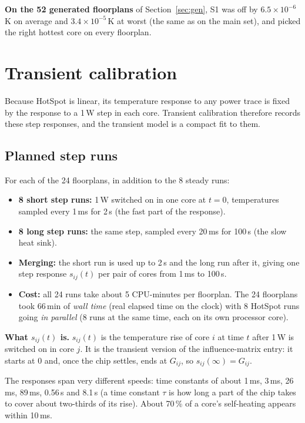 \documentclass[11pt,a4paper]{article}
\begin{document}
\textbf{On the 52 generated floorplans} of Section~\ref{sec:gen}, S1 was off by
$6.5\times10^{-6}$\,K on average and $3.4\times10^{-5}$\,K at worst (the same as on the main set),
and picked the right hottest core on every floorplan.

\section{Transient calibration}
Because HotSpot is linear, its temperature response to any power trace is fixed by the response
to a 1\,W step in each core. Transient calibration therefore records these step responses, and the
transient model is a compact fit to them.

\subsection{Planned step runs}
For each of the 24 floorplans, in addition to the 8 steady runs:
\begin{itemize}
  \item \textbf{8 short step runs:} 1\,W switched on in one core at $t = 0$, temperatures sampled
        every 1\,ms for 2\,s (the fast part of the response).
  \item \textbf{8 long step runs:} the same step, sampled every 20\,ms for 100\,s (the slow heat
        sink).
  \item \textbf{Merging:} the short run is used up to 2\,s and the long run after it, giving one
        step response $s_{ij}(t)$ per pair of cores from 1\,ms to 100\,s.
  \item \textbf{Cost:} all 24 runs take about 5 CPU-minutes per floorplan. The 24 floorplans took
        66\,min of \emph{wall time} (real elapsed time on the clock) with 8 HotSpot runs going
        \emph{in parallel} (8 runs at the same time, each on its own processor core).
\end{itemize}

\textbf{What $s_{ij}(t)$ is.} $s_{ij}(t)$ is the temperature rise of core $i$ at time $t$ after
1\,W is switched on in core $j$. It is the transient version of the influence-matrix entry: it
starts at 0 and, once the chip settles, ends at $G_{ij}$, so $s_{ij}(\infty) = G_{ij}$.

The responses span very different speeds: time constants of about 1\,ms, 3\,ms, 26\,ms, 89\,ms,
0.56\,s and 8.1\,s (a time constant $\tau$ is how long a part of the chip takes to cover about
two-thirds of its rise). About 70\,\% of a core's self-heating appears within 10\,ms.
\end{document}

